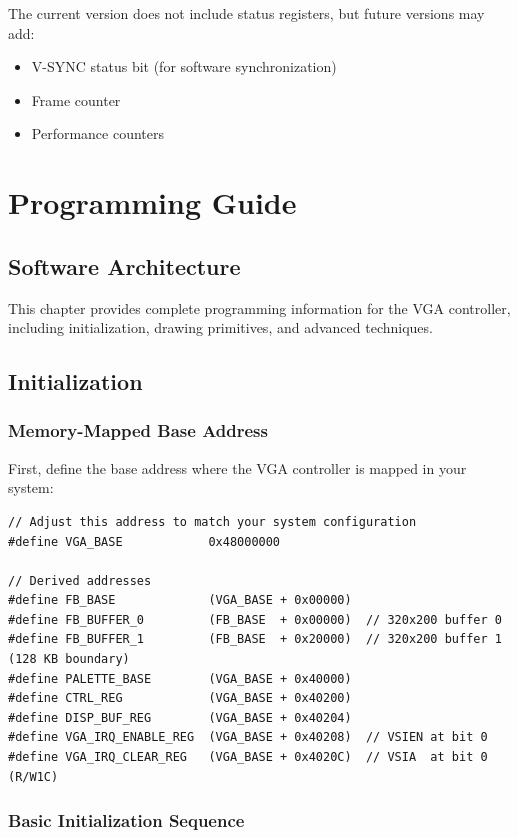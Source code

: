 \documentclass[11pt,letterpaper]{report}
\begin{document}
The current version does not include status registers, but future versions may add:

\begin{itemize}
    \item V-SYNC status bit (for software synchronization)
    \item Frame counter
    \item Performance counters
\end{itemize}

\chapter{Programming Guide}
\label{ch:programming}

\section{Software Architecture}

This chapter provides complete programming information for the VGA controller, including initialization, drawing primitives, and advanced techniques.

\section{Initialization}

\subsection{Memory-Mapped Base Address}

First, define the base address where the VGA controller is mapped in your system:

\begin{lstlisting}[style=c]
// Adjust this address to match your system configuration
#define VGA_BASE            0x48000000

// Derived addresses
#define FB_BASE             (VGA_BASE + 0x00000)
#define FB_BUFFER_0         (FB_BASE  + 0x00000)  // 320x200 buffer 0
#define FB_BUFFER_1         (FB_BASE  + 0x20000)  // 320x200 buffer 1 (128 KB boundary)
#define PALETTE_BASE        (VGA_BASE + 0x40000)
#define CTRL_REG            (VGA_BASE + 0x40200)
#define DISP_BUF_REG        (VGA_BASE + 0x40204)
#define VGA_IRQ_ENABLE_REG  (VGA_BASE + 0x40208)  // VSIEN at bit 0
#define VGA_IRQ_CLEAR_REG   (VGA_BASE + 0x4020C)  // VSIA  at bit 0 (R/W1C)
\end{lstlisting}

\subsection{Basic Initialization Sequence}
\end{document}
